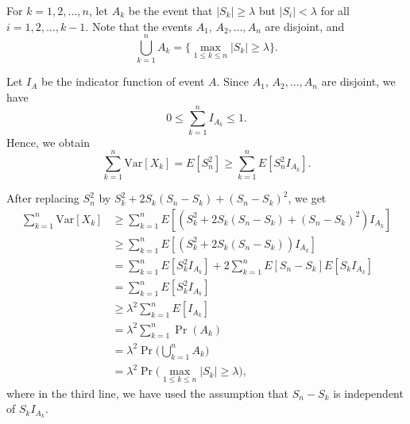 \documentclass[12pt]{article}
\begin{document}
For $k = 1,2,\ldots, n$, let $A_k$ be the event that $|S_k| \geq \lambda$ but $|S_i| < \lambda$ for all $i=1,2,\ldots, k-1$. Note that the events $A_1$, $A_2, \ldots , A_n$ are disjoint, and
\[
\bigcup_{k=1}^n A_k = \Big\{ \max_{1\leq k \leq n} |S_k| \geq \lambda \Big\}.
\]

Let $I_A$ be the indicator function of event $A$. Since $A_1$, $A_2, \ldots , A_n$ are disjoint, we have
\[
0 \leq \sum_{k=1}^n I_{A_k} \leq 1.
\]
Hence, we obtain
\[ \sum_{k=1}^n \text{Var}[X_k] = E[S_n^2] 
 \geq \sum_{k=1}^n E[S_n^2 I_{A_k}].
\]

After replacing $S_n^2$ by $S_k^2 + 2S_k(S_n-S_k) + (S_n-S_k)^2$, we get
\begin{align*}
\sum_{k=1}^n \text{Var}[X_k] &\geq 
\sum_{k=1}^n E[ (S_k^2 + 2S_k(S_n-S_k) + (S_n-S_k)^2) I_{A_k}] \\
&\geq  \sum_{k=1}^n E[ (S_k^2 + 2S_k(S_n-S_k)) I_{A_k}] \\
&=  \sum_{k=1}^n E[ S_k^2 I_{A_k}] + 2 \sum_{k=1}^n E[S_n-S_k]E[S_k I_{A_k}] \\
&= \sum_{k=1}^n E[ S_k^2 I_{A_k}] \\
& \geq \lambda^2 \sum_{k=1}^n E[I_{A_k}] \\
& = \lambda^2  \sum_{k=1}^n \Pr(A_k) \\
& = \lambda^2 \Pr \Big( \bigcup_{k=1}^n A_k \Big) \\
& = \lambda^2 \Pr \Big( \max_{1\leq k \leq n} |S_k| \geq \lambda \Big),
\end{align*}
where in the third line, we have used the assumption that $S_n-S_k$ is independent of $S_k I_{A_k}$.

\end{document}
